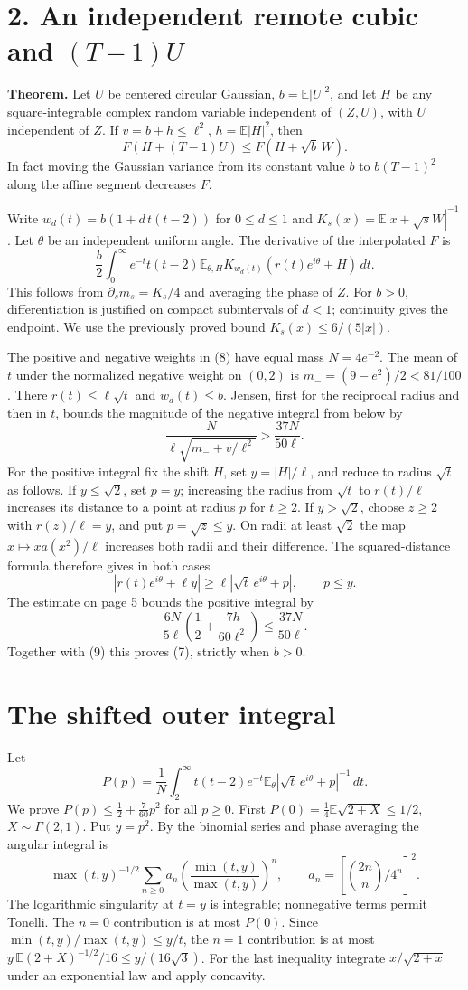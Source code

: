 \documentclass[11pt]{article}
\newcommand{\E}{\mathbb E}
\newcommand{\dd}{\,d}
\newcommand{\head}[1]{\section*{#1}}
\begin{document}
\newpage
\head{2. An independent remote cubic and \((T-1)U\)}
\textbf{Theorem.} Let \(U\) be centered circular Gaussian, \(b=\E|U|^2\),
and let \(H\) be any square-integrable complex random variable independent of
\((Z,U)\), with \(U\) independent of \(Z\). If \(v=b+h\le\ell^2\), \(h=\E|H|^2\), then
\[
       \boxed{\quad F(H+(T-1)U)\le F(H+\sqrt b\,W).\quad}                  \tag{7}
\]
In fact moving the Gaussian variance from its constant value \(b\) to
\(b(T-1)^2\) along the affine segment decreases \(F\).

Write \(w_d(t)=b(1+d\,t(t-2))\) for \(0\le d\le1\) and
\(K_s(x)=\E|x+\sqrt s W|^{-1}\). Let \(\theta\) be an independent uniform angle.
The derivative of the interpolated \(F\) is
\[
 \frac b2\int_0^\infty e^{-t}t(t-2)
       \E_{\theta,H}K_{w_d(t)}(r(t)e^{i\theta}+H)\dd t.                   \tag{8}
\]
This follows from \(\partial_s m_s=K_s/4\) and averaging the phase of \(Z\).
For \(b>0\), differentiation is justified on compact subintervals of \(d<1\);
continuity gives the endpoint. We use the previously proved bound
\(K_s(x)\le6/(5|x|)\).

The positive and negative weights in (8) have equal mass \(N=4e^{-2}\).
The mean of \(t\) under the normalized negative weight on \((0,2)\) is
\(m_-=(9-e^2)/2<81/100\). There \(r(t)\le\ell\sqrt t\) and \(w_d(t)\le b\).
Jensen, first for the reciprocal radius and then in \(t\), bounds the magnitude
of the negative integral from below by
\[
       \frac{N}{\ell\sqrt{m_-+v/\ell^2}}>\frac{37N}{50\ell}.              \tag{9}
\]
For the positive integral fix the shift \(H\), set \(y=|H|/\ell\), and reduce
to radius \(\sqrt t\) as follows. If \(y\le\sqrt2\), set \(p=y\); increasing
the radius from \(\sqrt t\) to \(r(t)/\ell\) increases its distance to a point
at radius \(p\) for \(t\ge2\). If \(y>\sqrt2\), choose \(z\ge2\) with
\(r(z)/\ell=y\), and put \(p=\sqrt z\le y\). On radii at least \(\sqrt2\) the
map \(x\mapsto xa(x^2)/\ell\) increases both radii and their difference.
The squared-distance formula therefore gives in both cases
\[
       |r(t)e^{i\theta}+\ell y|\ge\ell|\sqrt t\,e^{i\theta}+p|,\qquad p\le y .
\]
The estimate on page 5 bounds the positive integral by
\[
       \frac{6N}{5\ell}\left(\frac12+\frac{7h}{60\ell^2}\right)
       \le \frac{37N}{50\ell}.
\]
Together with (9) this proves (7), strictly when \(b>0\).

\newpage
\head{The shifted outer integral}
Let
\[
 P(p)=\frac1N\int_2^\infty t(t-2)e^{-t}
             \E_\theta|\sqrt t\,e^{i\theta}+p|^{-1}\dd t .
\]
We prove \(P(p)\le\frac12+\frac7{60}p^2\) for all \(p\ge0\). First
\(P(0)=\frac14\E\sqrt{2+X}\le1/2\), \(X\sim\Gamma(2,1)\).
Put \(y=p^2\). By the binomial series and phase averaging the angular integral is
\[
 \max(t,y)^{-1/2}\sum_{n\ge0} a_n
 \left(\frac{\min(t,y)}{\max(t,y)}\right)^n,\qquad
 a_n=\left[\binom{2n}{n}/4^n\right]^2 .
\]
The logarithmic singularity at \(t=y\) is integrable; nonnegative terms permit
Tonelli. The \(n=0\) contribution is at most \(P(0)\). Since
\(\min(t,y)/\max(t,y)\le y/t\), the \(n=1\) contribution is at most
\(y\,\E(2+X)^{-1/2}/16\le y/(16\sqrt3)\). For the last inequality integrate
\(x/\sqrt{2+x}\) under an exponential law and apply concavity.
\end{document}

